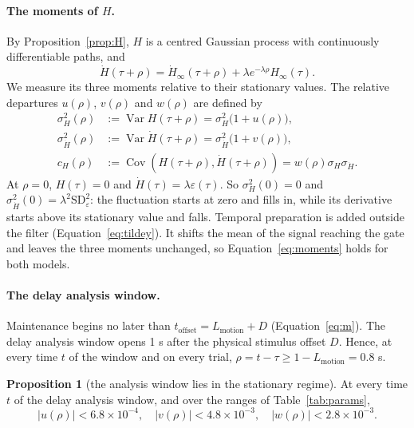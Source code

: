 \documentclass[a4paper,11pt]{article}
\theoremstyle{definition}
\newtheorem{proposition}{Proposition}
\newcommand{\Var}{\operatorname{Var}}
\newcommand{\Cov}{\operatorname{Cov}}
\newcommand{\1}{\mathbbm{1}}
\begin{document}
\paragraph{The moments of $H$.} By Proposition~\ref{prop:H}, $H$ is a centred Gaussian process with continuously differentiable paths, and
\begin{equation}\label{eq:Hdot}
\dot{H}(\tau+\rho)=\dot{H}_{\infty}(\tau+\rho)+\lambda e^{-\lambda\rho}H_{\infty}(\tau).
\end{equation}
We measure its three moments relative to their stationary values. The relative departures $u(\rho)$, $v(\rho)$ and $w(\rho)$ are defined by
\begin{equation}\label{eq:moments}
\begin{aligned}
\sigma_{H}^{2}(\rho)&:=\Var H(\tau+\rho)=\sigma_{H}^{2}\bigl(1+u(\rho)\bigr),\\
\sigma_{\dot{H}}^{2}(\rho)&:=\Var\dot{H}(\tau+\rho)=\sigma_{\dot{H}}^{2}\bigl(1+v(\rho)\bigr),\\
c_{H}(\rho)&:=\Cov\left(H(\tau+\rho),\dot{H}(\tau+\rho)\right)=w(\rho)\sigma_{H}\sigma_{\dot{H}}.
\end{aligned}
\end{equation}
At $\rho=0$, $H(\tau)=0$ and $\dot{H}(\tau)=\lambda\varepsilon(\tau)$. So $\sigma_{H}^{2}(0)=0$ and $\sigma_{\dot{H}}^{2}(0)=\lambda^{2}\mathrm{SD}_{\varepsilon}^{2}$: the fluctuation starts at zero and fills in, while its derivative starts above its stationary value and falls. Temporal preparation is added outside the filter (Equation~\eqref{eq:tildey}). It shifts the mean of the signal reaching the gate and leaves the three moments unchanged, so Equation~\eqref{eq:moments} holds for both models.

\paragraph{The delay analysis window.} Maintenance begins no later than ${t}_{\mathrm{offset}}={L}_{\mathrm{motion}}+D$ (Equation~\eqref{eq:m}). The delay analysis window opens 1 s after the physical stimulus offset $D$. Hence, at every time $t$ of the window and on every trial, $\rho=t-\tau\ge 1-{L}_{\mathrm{motion}}=0.8$ s.

\begin{proposition}[the analysis window lies in the stationary regime]\label{prop:stationary}
At every time $t$ of the delay analysis window, and over the ranges of Table~\ref{tab:params},
\begin{equation}\label{eq:uvw_bounds}
\left|u(\rho)\right|<6.8\times 10^{-4}, \quad \left|v(\rho)\right|<4.8\times 10^{-3}, \quad \left|w(\rho)\right|<2.8\times 10^{-3}.
\end{equation}
\end{proposition}
\end{document}
